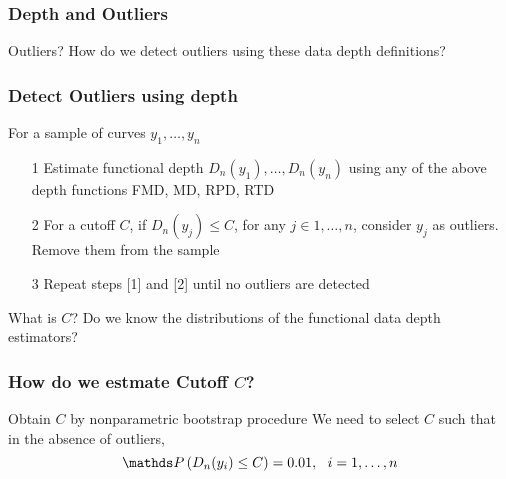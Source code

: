 \documentclass[10pt,dvipsnames,table]{beamer}
\begin{document}
%

\begin{frame}
\frametitle{Depth and Outliers}
\Large
\begin{block}{Outliers?}
How do we detect outliers using these data depth definitions?
\end{block}
\end{frame}

\begin{frame}
\frametitle{Detect Outliers using depth}
For a sample of curves $y_1, \dots , y_n$
\begin{enumerate}
\item[1] Estimate functional depth $D_n(y_1), \dots , D_n(y_n)$ using any of the above depth functions FMD, MD, RPD, RTD
\item[2] For a cutoff $C$, if $D_n(y_j) \leq C$, for any $j \in 1, \dots, n$, consider $y_j$ as outliers. Remove them from the sample
\item[3] Repeat steps [1] and [2] until no outliers are detected
\end{enumerate}
\vspace{1cm}
\pause
\begin{block}{What is $C$?}
Do we know the distributions of the functional data depth estimators?
\end{block}

\end{frame}

\begin{frame}
\frametitle{How do we estmate Cutoff $C$?}
\Large
\begin{block}{Obtain $C$ by nonparametric bootstrap procedure}
We need to select $C$ such that in the absence of outliers, \[ \Prob\left( D_n(y_i) \leq C\right) = 0.01,\ \ i = 1, \dots, n \]
\end{block}

\end{frame}
\end{document}

